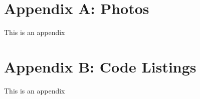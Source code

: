 \chapter{Appendix A: Photos} \label{appendix1}
This is an appendix

\chapter{Appendix B: Code Listings} \label{appendix2}
This is an appendix